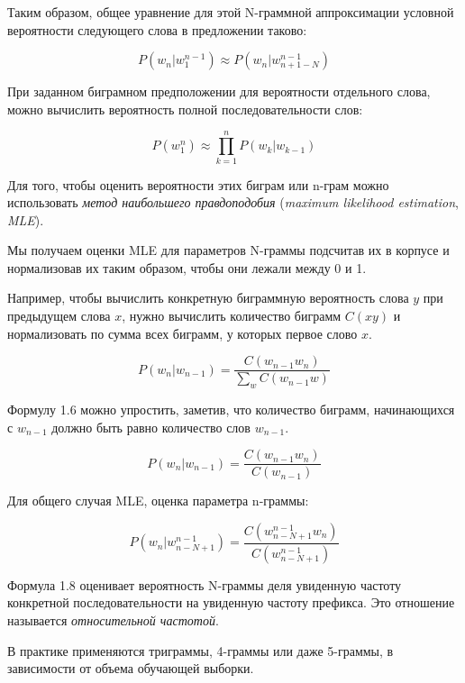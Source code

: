 \documentclass[a4paper,12pt,preview]{report} %
\begin{document}
	Таким образом, общее уравнение для этой N-граммной аппроксимации условной вероятности следующего слова в предложении таково:
	
	\begin{equation}
	 P(w_n | w_1^{n-1}) \approx P(w_n | w_{n+1-N}^{n-1}) 
	\end{equation}
	 
	 При заданном биграмном предположении для вероятности отдельного слова, можно вычислить вероятность полной последовательности слов:
	 
	\begin{equation}
		P(w_1^n) \approx \prod_{k=1}^{n} P(w_k | w_{k-1})
	\end{equation}
	
	Для того, чтобы оценить вероятности этих биграм или n-грам можно использовать \textit{метод наибольшего правдоподобия} (\textit{maximum likelihood estimation}, \textit{MLE}). 
	
	Мы получаем оценки MLE для параметров N-граммы подсчитав их в корпусе и нормализовав их таким образом, чтобы они лежали между 0 и 1.
	
	Например, чтобы вычислить конкретную биграммную вероятность слова $y$ при предыдущем слова $x$, нужно вычислить количество биграмм $C(xy)$ и нормализовать по сумма всех биграмм, у которых первое слово $x$.
	
	\begin{equation}
		P(w_n | w_{n-1}) = \dfrac{C(w_{n-1}w_n)}{\sum_w C(w_{n-1}w)}
	\end{equation}
	
	Формулу 1.6 можно упростить, заметив, что количество биграмм, начинающихся с $w_{n-1}$ должно быть равно количество слов $w_{n-1}$. 
	
	\begin{equation}
		P(w_n | w_{n-1}) = \dfrac{C(w_{n-1}w_n)}{C(w_{n-1})}
	\end{equation}


	Для общего случая MLE, оценка параметра n-граммы:
	
	
	\begin{equation}
		P(w_n | w_{n-N+1}^{n-1}) = \dfrac{C(w_{n-N+1}^{n-1} w_n)}{C(w_{n-N+1}^{n-1})}
	\end{equation}
	
	Формула 1.8 оценивает вероятность N-граммы деля увиденную частоту конкретной последовательности на увиденную частоту префикса. Это отношение называется \textit{относительной частотой}.
	
	В практике применяются триграммы, 4-граммы или даже 5-граммы, в зависимости от объема обучающей выборки. 
	
\end{document}
